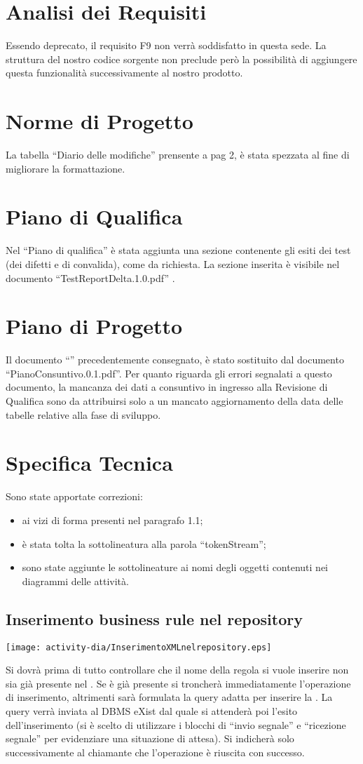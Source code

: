 \section{Analisi dei Requisiti}
Essendo deprecato, il requisito F9 non verr\`a soddisfatto in questa sede. La struttura del nostro codice sorgente non preclude per\`o la possibilit\`a di aggiungere questa funzionalit\`a successivamente al nostro prodotto.
\section{Norme di Progetto}
La tabella ``Diario delle modifiche'' prensente a pag 2, \`e stata spezzata al fine di migliorare la formattazione.
\section{Piano di Qualifica}
Nel ``Piano di qualifica'' \`e stata aggiunta una sezione contenente gli esiti dei test (dei difetti e di convalida), come da richiesta. La sezione inserita \`e visibile nel documento ``TestReportDelta.1.0.pdf'' .


\section{Piano di Progetto}
Il documento ``\PdP'' precedentemente consegnato, \`e stato sostituito dal documento ``PianoConsuntivo.0.1.pdf''.
Per quanto riguarda gli errori segnalati a questo documento, la mancanza dei dati a consuntivo in ingresso alla Revisione di Qualifica sono da attribuirsi solo a un mancato aggiornamento della data delle tabelle relative alla fase di sviluppo. 
\section{Specifica Tecnica}
Sono state apportate correzioni:
\begin{itemize}
\item ai vizi di forma presenti nel paragrafo 1.1;
\item \`e stata tolta la sottolineatura alla parola ``tokenStream'';
\item sono state aggiunte le sottolineature ai nomi degli oggetti contenuti nei diagrammi delle attivit\`a.
\end{itemize}
\begin{center} 
\subsection{Inserimento business rule nel repository}
\texttt{[image: activity-dia/InserimentoXMLnelrepository.eps]}
\end{center}
Si dovr\`a prima di tutto controllare che il nome della regola si vuole inserire non sia gi\`a presente nel \rp. Se \`e gi\`a presente si troncher\`a immediatamente l'operazione di inserimento, altrimenti sar\`a formulata la query adatta per inserire la \br . La query verr\`a inviata al DBMS eXist dal quale si attender\`a poi l'esito dell'inserimento (si \`e scelto di utilizzare i blocchi di ``invio segnale'' e ``ricezione segnale'' per evidenziare una situazione di attesa). Si indicher\`a solo successivamente al chiamante che l'operazione \`e riuscita con successo.
